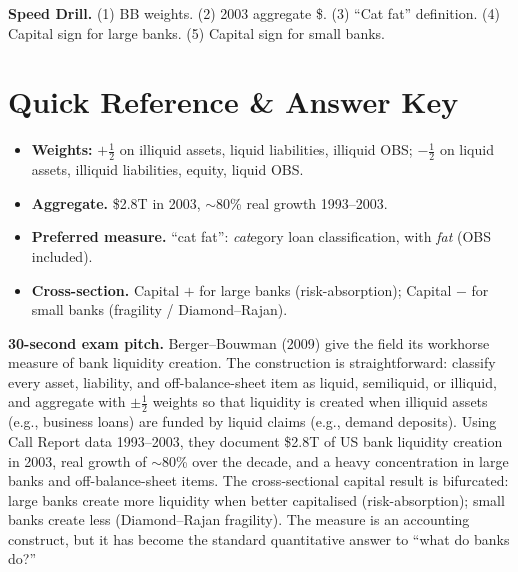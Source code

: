 \documentclass[11pt]{article}
\begin{document}
\vspace{6pt}
\begin{drillbox}
\textbf{Speed Drill.} (1) BB weights. (2) 2003 aggregate \$. (3) ``Cat fat'' definition. (4) Capital sign for large banks. (5) Capital sign for small banks.
\end{drillbox}

\section*{Quick Reference \& Answer Key}
\begin{answerbox}
\begin{itemize}
\item \textbf{Weights:} $+\tfrac12$ on illiquid assets, liquid liabilities, illiquid OBS; $-\tfrac12$ on liquid assets, illiquid liabilities, equity, liquid OBS.
\item \textbf{Aggregate.} \$2.8T in 2003, $\sim$80\% real growth 1993--2003.
\item \textbf{Preferred measure.} ``cat fat'': \emph{cat}egory loan classification, with \emph{fat} (OBS included).
\item \textbf{Cross-section.} Capital $+$ for large banks (risk-absorption); Capital $-$ for small banks (fragility / Diamond--Rajan).
\end{itemize}
\end{answerbox}

\begin{keybox}
\textbf{30-second exam pitch.} Berger--Bouwman (2009) give the field its workhorse measure of bank liquidity creation. The construction is straightforward: classify every asset, liability, and off-balance-sheet item as liquid, semiliquid, or illiquid, and aggregate with $\pm\tfrac12$ weights so that liquidity is created when illiquid assets (e.g., business loans) are funded by liquid claims (e.g., demand deposits). Using Call Report data 1993--2003, they document \$2.8T of US bank liquidity creation in 2003, real growth of $\sim$80\% over the decade, and a heavy concentration in large banks and off-balance-sheet items. The cross-sectional capital result is bifurcated: large banks create more liquidity when better capitalised (risk-absorption); small banks create less (Diamond--Rajan fragility). The measure is an accounting construct, but it has become the standard quantitative answer to ``what do banks do?''
\end{keybox}
\end{document}
